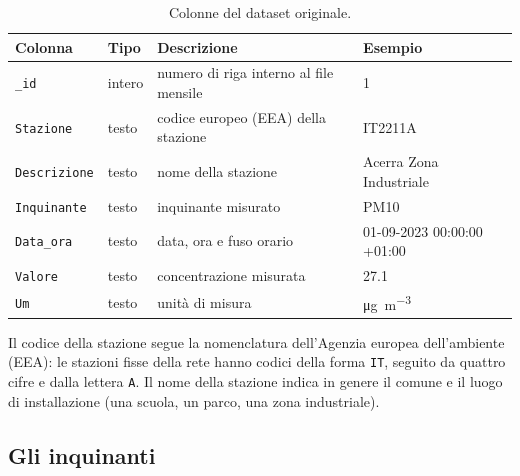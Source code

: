 \documentclass[11pt]{report}
\newcommand{\ugm}{\si{\micro\gram\per\cubic\metre}}
\begin{document}
\begin{table}[H]
  \centering
  \caption{Colonne del dataset originale.}
  \label{tab:colonne}
  \begin{tabularx}{\textwidth}{l l >{\raggedright\arraybackslash}X l}
    \toprule
    \textbf{Colonna}     & \textbf{Tipo} & \textbf{Descrizione}                   & \textbf{Esempio}           \\
    \midrule
    \texttt{\_id}        & intero        & numero di riga interno al file mensile & 1                          \\
    \texttt{Stazione}    & testo         & codice europeo (EEA) della stazione    & IT2211A                    \\
    \texttt{Descrizione} & testo         & nome della stazione                    & Acerra Zona Industriale    \\
    \texttt{Inquinante}  & testo         & inquinante misurato                    & PM10                       \\
    \texttt{Data\_ora}   & testo         & data, ora e fuso orario                & 01-09-2023 00:00:00 +01:00 \\
    \texttt{Valore}      & testo         & concentrazione misurata                & 27.1                       \\
    \texttt{Um}          & testo         & unità di misura                        & \ugm                       \\
    \bottomrule
  \end{tabularx}
\end{table}

Il codice della stazione segue la nomenclatura dell'Agenzia europea
dell'ambiente (EEA): le stazioni fisse della rete hanno codici della forma
\texttt{IT}, seguito da quattro cifre e dalla lettera \texttt{A}. Il nome della
stazione indica in genere il comune e il luogo di installazione (una scuola, un
parco, una zona industriale).

\subsection{Gli inquinanti}
\end{document}
